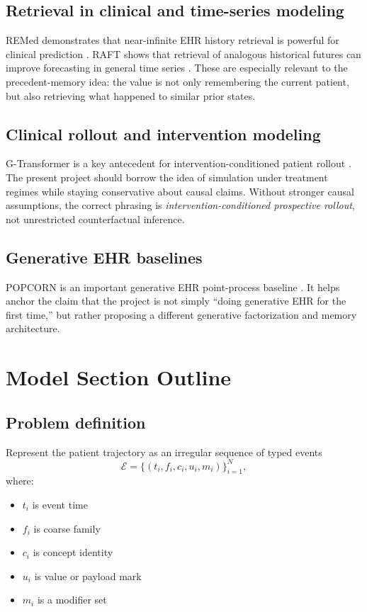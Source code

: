 \documentclass[11pt]{article}
\begin{document}
\subsection{Retrieval in clinical and time-series modeling}

REMed demonstrates that near-infinite EHR history retrieval is powerful for
clinical prediction \cite{kim2024remed}. RAFT shows that retrieval of analogous
historical futures can improve forecasting in general time series
\cite{han2025raft}. These are especially relevant to the precedent-memory idea:
the value is not only remembering the current patient, but also retrieving what
happened to similar prior states.

\subsection{Clinical rollout and intervention modeling}

G-Transformer is a key antecedent for intervention-conditioned patient rollout
\cite{xiong2024gtransformer}. The present project should borrow the idea of
simulation under treatment regimes while staying conservative about causal
claims. Without stronger causal assumptions, the correct phrasing is
\emph{intervention-conditioned prospective rollout}, not unrestricted
counterfactual inference.

\subsection{Generative EHR baselines}

POPCORN is an important generative EHR point-process baseline
\cite{bhave2021popcorn}. It helps anchor the claim that the project is not
simply ``doing generative EHR for the first time,'' but rather proposing a
different generative factorization and memory architecture.

\section{Model Section Outline}

\subsection{Problem definition}

Represent the patient trajectory as an irregular sequence of typed events
\[
    \mathcal{E} = \{(t_i, f_i, c_i, u_i, m_i)\}_{i=1}^{N},
\]
where:
\begin{itemize}
    \item $t_i$ is event time
    \item $f_i$ is coarse family
    \item $c_i$ is concept identity
    \item $u_i$ is value or payload mark
    \item $m_i$ is a modifier set
\end{itemize}
\end{document}
